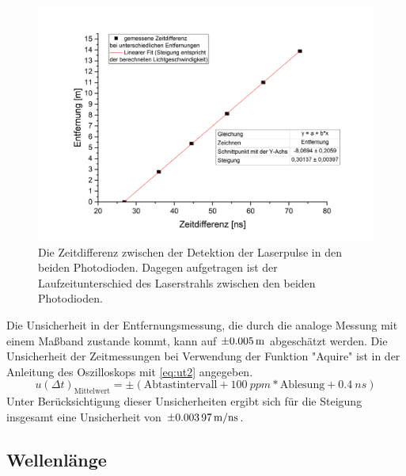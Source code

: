 \documentclass[
	a4paper,
	12pt,
	pagesize,
	ngerman
]{scrartcl}
\begin{document}
\begin{figure}[ht!]
	\centering
	\includegraphics[scale=0.6]{lichtgeschwindigkeit.png}
	\caption{Die Zeitdifferenz zwischen der Detektion der Laserpulse in den beiden Photodioden. Dagegen aufgetragen ist der Laufzeitunterschied des Laserstrahls zwischen den beiden Photodioden.}
	\label{lichtgeschwindigkeit}
\end{figure}

Die Unsicherheit in der Entfernungsmessung, die durch die analoge Messung mit einem Maßband zustande kommt, kann auf $\SI{\pm0,005}{m}$ abgeschätzt werden. Die Unsicherheit der Zeitmessungen bei Verwendung der Funktion "Aquire" ist in der Anleitung des Oszilloskops mit \cref{eq:ut2} angegeben.
\begin{equation}
	u(\Delta t)_\text{Mittelwert} = \pm(\text{Abtastintervall} + \SI{100}{ppm} * \text{Ablesung} + \SI{0,4}{ns})
	\label{eq:ut2}
\end{equation}
Unter Berücksichtigung dieser Unsicherheiten ergibt sich für die Steigung insgesamt eine Unsicherheit von $\SI{\pm0,00397}{m/ns}$.

\subsection{Wellenlänge}
\end{document}
